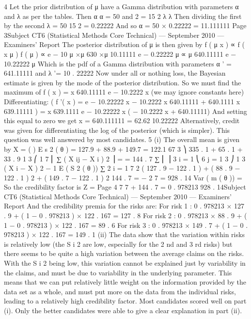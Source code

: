 \documentclass[a4paper,12pt]{article}
\begin{document}
4
Let the prior distribution of μ have a Gamma distribution with parameters α and λ
as per the tables.
Then
α
α
= 50 and 2 = 15 2
λ
λ
Then dividing the first by the second λ =
50
15 2
= 0.22222
And so α = 50 × 0.22222 = 11.111111
Page 3Subject CT6 (Statistical Methods Core Technical) — September 2010 — Examiners’ Report
The posterior distribution of μ is then given by
f ( μ x ) ∝ f ( x μ ) f ( μ )
∝ e − 10 μ ×μ 630 ×μ 10.11111 e − 0.22222 μ
∝ μ 640.11111 e − 10.22222 μ
Which is the pdf of a Gamma distribution with parameters α ' = 641.11111 and
λ '= 10 . 22222
Now under all or nothing loss, the Bayesian estimate is given by the mode of the
posterior distribution. So we must find the maximum of
f ( x ) = x 640.11111 e − 10.2222 x (we may ignore constants here)
Differentiating:
(
f '( x ) = e − 10.22222 x − 10.2222 x 640.11111 + 640.1111 x 639.11111
)
= x 639.1111 e − 10.22222 x ( − 10.2222 x + 640.11111)
And setting this equal to zero we get
x =
640.111111
= 62.62
10.22222
Alternatively, credit was given for differentiating the log of the posterior (which is simpler).
This question was well answered by most candidates.
5
(i)
The overall mean is given by X =
(
)
E s 2 ( θ ) =
127.9 + 88.9 + 149.7
= 122.1 67
3
⎞ 335 . 1 + 65 . 1 + 33 . 9
1 3 ⎛ 1 7
⎜ ∑ ( X ij − X i ) 2 ⎟ =
= 144 . 7
∑
⎜
⎟
3 i = 1 ⎝ 6 j = 1
3
⎠
1 3
( X i − X ) 2 − 1 E ( S 2 ( θ ))
∑
2 i = 1
7
2
( 127 . 9 − 122 . 1 ) + ( 88 . 9 − 122 . 1 ) 2 + ( 149 . 7 − 122 . 1 ) 2 144 . 7
=
−
2
7
= 928 . 14
Var ( m ( θ )) =
So the credibility factor is Z =
Page 4
7
7 + 144 . 7
= 0 . 978213
928 . 14Subject CT6 (Statistical Methods Core Technical) — September 2010 — Examiners’ Report
And the credibility premia for the risks are:
For risk 1 : 0 . 978213 × 127 . 9 + ( 1 − 0 . 978213 ) × 122 . 167 = 127 . 8
For risk 2 : 0 . 978213 × 88 . 9 + ( 1 − 0 . 978213 ) × 122 . 167 = 89 . 6
For risk 3 : 0 . 978213 × 149 . 7 + ( 1 − 0 . 978213 ) × 122 . 167 = 149 . 1
(ii)
The data show that the variation within risks is relatively low (the S i 2 are low,
especially for the 2 nd and 3 rd risks) but there seems to be quite a high variation
between the average claims on the risks.
With the S i 2 being low, this variation cannot be explained just by variability
in the claims, and must be due to variability in the underlying parameter.
This means that we can put relatively little weight on the information provided
by the data set as a whole, and must put more on the data from the individual
risks, leading to a relatively high credibility factor.
Most candidates scored well on part (i). Only the better candidates were able to give a clear
explanation in part (ii).
\end{document}

